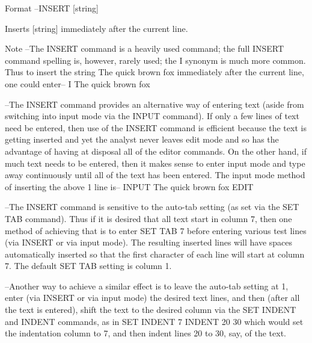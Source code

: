 Format  --INSERT   [string]
 
          Inserts [string] immediately after the
          current line.
 
Note    --The INSERT command is a heavily used command;
          the full INSERT command spelling is, however,
          rarely used; the    I    synonym is much more
          common.  Thus to insert the string
             The quick brown fox
          immediately after the current line,
          one could enter--
             I The quick brown fox
 
        --The INSERT command provides an
          alternative way of entering text
          (aside from switching into    input mode
          via the INPUT command).  If only a few
          lines of text need be entered, then use
          of the INSERT command is efficient because
          the text is getting inserted and yet
          the analyst never leaves   edit mode   and
          so has the advantage of having at disposal
          all of the editor commands.  On the other
          hand, if much text needs to be entered, then
          it makes sense to enter    input mode
          and type away continuously until all of
          the text has been entered.  The    input mode
          method of inserting the above 1 line is--
             INPUT
             The quick brown fox
             EDIT
 
        --The INSERT command is sensitive to
          the auto-tab setting (as set via the
          SET TAB command).  Thus if it is desired
          that all text start in column 7, then
          one method of achieving that is to enter
             SET TAB 7
          before entering various test lines
          (via INSERT or via input mode).
          The resulting inserted lines
          will have spaces automatically
          inserted so that the first
          character of each line will start
          at column 7.  The default
          SET TAB setting is column 1.
 
        --Another way to achieve a similar effect
          is to leave the auto-tab setting at 1,
          enter (via INSERT or via input mode) the
          desired text lines, and then (after
          all the text is entered), shift the
          text to the desired column via the
          SET INDENT and INDENT commands, as in
             SET INDENT 7
             INDENT 20 30
          which would set the indentation column
          to 7, and then indent lines 20 to 30,
          say, of the text.
 
